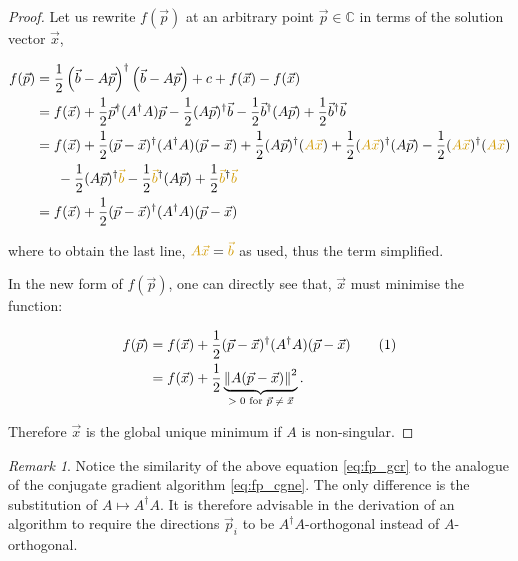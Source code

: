 \documentclass{article}
\newcommand\numberthis{\addtocounter{equation}{1}\tag{\theequation}}
\theoremstyle{plain} %
\theoremstyle{convention} %
\theoremstyle{remark} %
\newtheorem*{remark}{Remark} %
\numberwithin{equation}{section}
\begin{document}
\begin{proof}
Let us rewrite $f(\vec{p})$ at an arbitrary point $\vec{p} \in \mathbb{C}$ in terms of the solution vector $\vec{x}$,

\begin{align*}
    f(\vec{p}) &= \frac{1}{2} \left( \vec{b} - A \vec{p} \right)^{\dagger} \left( \vec{b} - A \vec{p} \right) + c + f(\vec{x}) - f(\vec{x}) \\
    &= f(\vec{x}) + \frac{1}{2} \vec{p}^{\dagger} (A^{\dagger} A) \vec{p} - \frac{1}{2} (A \vec{p})^{\dagger} \vec{b} - \frac{1}{2} \vec{b}^{\dagger} (A \vec{p}) + \frac{1}{2} \vec{b}^{\dagger} \vec{b} \\
    &= f(\vec{x}) + \frac{1}{2} (\vec{p} - \vec{x})^{\dagger} (A^{\dagger} A) (\vec{p} - \vec{x}) + \frac{1}{2} (A \vec{p})^{\dagger} (\textcolor{cyellow}{A \vec{x}}) + \frac{1}{2} (\textcolor{cyellow}{A \vec{x}})^{\dagger} (A \vec{p}) - \frac{1}{2} (\textcolor{cyellow}{A \vec{x}})^{\dagger} (\textcolor{cyellow}{A \vec{x}}) \\
    &\phantom{==} - \frac{1}{2} (A \vec{p})^{\dagger} \textcolor{cyellow}{\vec{b}} - \frac{1}{2} \textcolor{cyellow}{\vec{b}}^{\dagger} (A \vec{p}) + \frac{1}{2} \textcolor{cyellow}{\vec{b}}^{\dagger} \textcolor{cyellow}{\vec{b}} \\
    &= f(\vec{x}) + \frac{1}{2} (\vec{p} - \vec{x})^{\dagger} (A^{\dagger} A) (\vec{p} - \vec{x}) \\
\end{align*}

where to obtain the last line, $\textcolor{cyellow}{A \vec{x}} = \textcolor{cyellow}{\vec{b}}$ as used, thus the term simplified.

In the new form of $f(\vec{p})$, one can directly see that, $\vec{x}$ must minimise the function:

\begin{align*}
    f(\vec{p}) &= f(\vec{x}) + \frac{1}{2} (\vec{p} - \vec{x})^{\dagger} (A^{\dagger} A) (\vec{p} - \vec{x}) \numberthis \label{eq:fp_gcr} \\
    &= f(\vec{x}) + \frac{1}{2} \underbrace{ \norm{ A (\vec{p} - \vec{x})}^2 }_{\text{$> 0$ for $\vec{p} \neq \vec{x}$}}.
\end{align*}

Therefore $\vec{x}$ is the global unique minimum if $A$ is non-singular.

\end{proof}

\begin{remark}
Notice the similarity of the above equation \eqref{eq:fp_gcr} to the analogue of the conjugate gradient algorithm \eqref{eq:fp_cgne}. The only difference is the substitution of $A \longmapsto A^{\dagger} A$. It is therefore advisable in the derivation of an algorithm to require the directions $\vec{p}_i$ to be $A^{\dagger} A$-orthogonal instead of $A$-orthogonal.
\end{remark}
\end{document}
